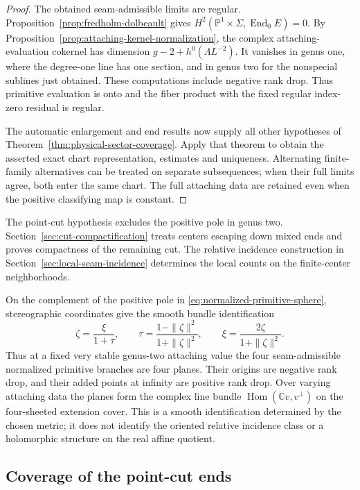 \documentclass[11pt]{amsart}
\theoremstyle{definition}
\theoremstyle{remark}
\theoremstyle{plain}
\begin{document}
\begin{proof}
The obtained seam-admissible limits are regular.
Proposition~\ref{prop:fredholm-dolbeault} gives
$H^2(\mathbb P^1\times\Sigma,\operatorname{End}_0E)=0$.
By Proposition~\ref{prop:attaching-kernel-normalization},
the complex attaching-evaluation cokernel has dimension
$g-2+h^0(\Lambda L^{-2})$. It vanishes in genus one,
where the degree-one line has one section, and in genus
two for the nonspecial sublines just obtained.
These computations include negative rank drop.
Thus primitive evaluation is onto and the fiber product
with the fixed regular index-zero residual is regular.

The automatic enlargement and end results now supply
all other hypotheses of
Theorem~\ref{thm:physical-sector-coverage}. Apply that
theorem to obtain the asserted exact chart representation,
estimates and uniqueness. Alternating finite-family
alternatives can be treated on separate subsequences;
when their full limits agree, both enter the same chart.
The full attaching data are retained even when the
positive classifying map is constant.
\end{proof}

The point-cut hypothesis excludes the positive pole in genus two.
Section~\ref{sec:cut-compactification} treats centers escaping
down mixed ends and proves compactness of the remaining cut.
The relative incidence construction in
Section~\ref{sec:local-seam-incidence} determines the local
counts on the finite-center neighborhoods.

On the complement of the positive pole in
\eqref{eq:normalized-primitive-sphere}, stereographic coordinates give
the smooth bundle identification
\begin{equation}\label{eq:normalized-primitive-plane}
 \zeta=\frac{\xi}{1+\tau},\qquad
 \tau=\frac{1-\|\zeta\|^2}{1+\|\zeta\|^2},\qquad
 \xi=\frac{2\zeta}{1+\|\zeta\|^2}.
\end{equation}
Thus at a fixed very stable genus-two attaching value the four
seam-admissible normalized primitive branches are four planes.
Their origins are negative rank drop, and their added points
at infinity are positive rank drop. Over varying attaching data
the planes form the complex line bundle
$\operatorname{Hom}(\mathbb Cv,v^\perp)$ on the four-sheeted
extension cover. This is a smooth identification determined by
the chosen metric; it does not identify the oriented relative
incidence class or a holomorphic structure on the real affine quotient.

\subsection{Coverage of the point-cut ends}\label{sec:primitive-gluing}
\end{document}

